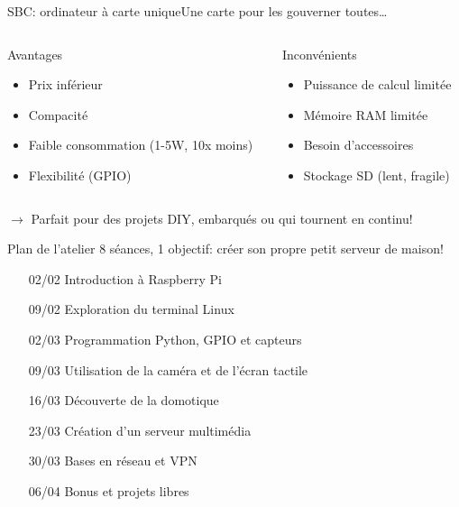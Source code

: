 \documentclass[
aspectratio=169 %
]{beamer}
\begin{document}
\begin{frame}{SBC: ordinateur à carte unique}{Une carte pour les gouverner
    toutes\ldots}
  \begin{columns}
    \begin{column}{.5\textwidth}
      \begin{block}{Avantages}
        \begin{itemize}
          \item Prix inférieur
          \item Compacité
          \item Faible consommation (1-5W, 10x moins)
          \item Flexibilité (GPIO)

        \end{itemize}

      \end{block}
    \end{column}
    \begin{column}{.5\textwidth}
      \begin{alertblock}{Inconvénients}
        \begin{itemize}
          \item Puissance de calcul
                limitée
          \item Mémoire RAM limitée
          \item Besoin d'accessoires
          \item Stockage SD
                (lent, fragile)
        \end{itemize}
      \end{alertblock}
    \end{column}
  \end{columns}

  \bigskip \bigskip \bigskip \centering \alert{\(\rightarrow\) Parfait pour des
    projets DIY, embarqués ou qui tournent en continu!
  }
\end{frame}

\begin{frame}{Plan de l'atelier}
  8 séances, 1 objectif: \alert{créer son propre petit serveur de maison!}

  \bigskip
  \begin{itemize}
    \item[02/02] Introduction à Raspberry Pi
    \item[09/02] Exploration du terminal Linux
    \item[02/03] Programmation Python, GPIO et capteurs
    \item[09/03] Utilisation de la caméra et de l'écran tactile
    \item[16/03] Découverte de la domotique
    \item[23/03] Création d'un serveur multimédia
    \item[30/03] Bases en réseau et VPN
    \item[06/04] Bonus et projets libres
  \end{itemize}
\end{frame}
\end{document}
